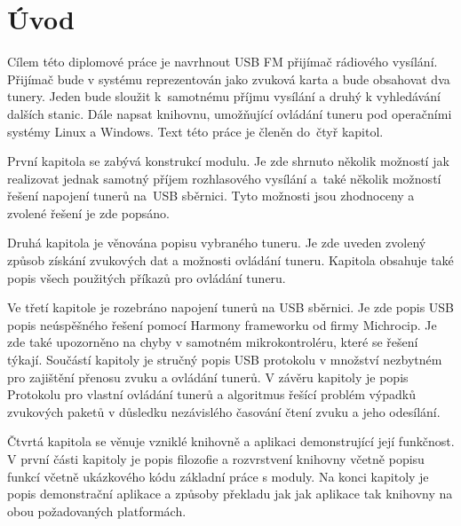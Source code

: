 \section{Úvod}
\label{sec:Uvod}

Cílem této diplomové práce je navrhnout USB FM přijímač rádiového vysílání. Přijímač bude v systému reprezentován jako zvuková karta a bude obsahovat dva tunery. Jeden bude sloužit k~samotnému příjmu vysílání a druhý k vyhledávání dalších stanic. Dále napsat knihovnu, umožňující ovládání tuneru pod operačními systémy Linux a Windows. Text této práce je členěn do~čtyř kapitol.

První kapitola se zabývá konstrukcí modulu. Je zde shrnuto několik možností jak realizovat jednak samotný příjem rozhlasového vysílání a~také několik možností řešení napojení tunerů na~USB sběrnici. Tyto možnosti jsou zhodnoceny a zvolené řešení je zde popsáno.

Druhá kapitola je věnována popisu vybraného tuneru. Je zde uveden zvolený způsob získání zvukových dat a možnosti ovládání tuneru. Kapitola obsahuje také popis všech použitých příkazů pro ovládání tuneru.

Ve třetí kapitole je rozebráno napojení tunerů na USB sběrnici. Je zde popis USB popis neúspěšného řešení pomocí Harmony frameworku od firmy Michrocip. Je zde také upozorněno na chyby v samotném mikrokontroléru, které se řešení týkají. Součástí kapitoly je stručný popis USB protokolu v množství nezbytném pro zajištění přenosu zvuku a ovládání tunerů. V závěru kapitoly je popis Protokolu pro vlastní ovládání tunerů a algoritmus řešící problém výpadků zvukových paketů v důsledku nezávislého časování čtení zvuku a jeho odesílání. 

Čtvrtá kapitola se věnuje vzniklé knihovně a aplikaci demonstrující její funkčnost. V první části kapitoly je popis filozofie a rozvrstvení knihovny včetně popisu funkcí včetně ukázkového kódu základní práce s moduly. Na konci kapitoly je popis demonstrační aplikace a způsoby překladu jak jak aplikace tak knihovny na obou požadovaných platformách.

